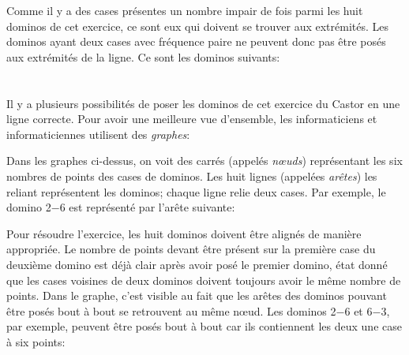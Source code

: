 {{{\centering%
\par}

Comme il y a des cases présentes un nombre impair de fois parmi les huit dominos de cet exercice, ce sont eux qui doivent se trouver aux extrémités. Les dominos ayant deux cases avec fréquence paire ne peuvent donc pas être posés aux extrémités de la ligne. Ce sont les dominos suivants:

{\centering%
\par}



\section*{\BrochureItsInformatics}
Il y a plusieurs possibilités de poser les dominos de cet exercice du Castor en une ligne correcte. Pour avoir une meilleure vue d’ensemble, les informaticiens et informaticiennes utilisent des \emph{graphes}:

{\centering%
\par}

Dans les graphes ci-dessus, on voit des carrés (appelés \emph{nœuds}) représentant les six nombres de points des cases de dominos. Les huit lignes (appelées \emph{arêtes}) les reliant représentent les dominos; chaque ligne relie deux cases. Par exemple, le domino 2$-6$ est représenté par l’arête suivante:

{\centering%
\par}

Pour résoudre l’exercice, les huit dominos doivent être alignés de manière appropriée. Le nombre de points devant être présent sur la première case du deuxième domino est déjà clair après avoir posé le premier domino, état donné que les cases voisines de deux dominos doivent toujours avoir le même nombre de points. Dans le graphe, c’est visible au fait que les arêtes des dominos pouvant être posés bout à bout se retrouvent au même nœud. Les dominos 2$-6$ et 6$-3$, par exemple, peuvent être posés bout à bout car ils contiennent les deux une case à six points:

{\centering%
\par}

}}
